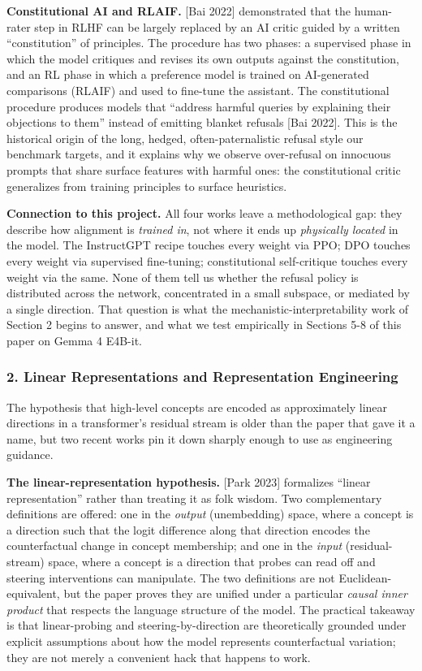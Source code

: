 \documentclass[
  11pt,
]{article}
\begin{document}
\textbf{Constitutional AI and RLAIF.} {[}Bai 2022{]} demonstrated that
the human-rater step in RLHF can be largely replaced by an AI critic
guided by a written ``constitution'' of principles. The procedure has
two phases: a supervised phase in which the model critiques and revises
its own outputs against the constitution, and an RL phase in which a
preference model is trained on AI-generated comparisons (RLAIF) and used
to fine-tune the assistant. The constitutional procedure produces models
that ``address harmful queries by explaining their objections to them''
instead of emitting blanket refusals {[}Bai 2022{]}. This is the
historical origin of the long, hedged, often-paternalistic refusal style
our benchmark targets, and it explains why we observe over-refusal on
innocuous prompts that share surface features with harmful ones: the
constitutional critic generalizes from training principles to surface
heuristics.

\textbf{Connection to this project.} All four works leave a
methodological gap: they describe how alignment is \emph{trained in},
not where it ends up \emph{physically located} in the model. The
InstructGPT recipe touches every weight via PPO; DPO touches every
weight via supervised fine-tuning; constitutional self-critique touches
every weight via the same. None of them tell us whether the refusal
policy is distributed across the network, concentrated in a small
subspace, or mediated by a single direction. That question is what the
mechanistic-interpretability work of Section 2 begins to answer, and
what we test empirically in Sections 5-8 of this paper on Gemma 4
E4B-it.

\subsubsection{2. Linear Representations and Representation
Engineering}\label{linear-representations-and-representation-engineering}

The hypothesis that high-level concepts are encoded as approximately
linear directions in a transformer's residual stream is older than the
paper that gave it a name, but two recent works pin it down sharply
enough to use as engineering guidance.

\textbf{The linear-representation hypothesis.} {[}Park 2023{]}
formalizes ``linear representation'' rather than treating it as folk
wisdom. Two complementary definitions are offered: one in the
\emph{output} (unembedding) space, where a concept is a direction such
that the logit difference along that direction encodes the
counterfactual change in concept membership; and one in the \emph{input}
(residual-stream) space, where a concept is a direction that probes can
read off and steering interventions can manipulate. The two definitions
are not Euclidean-equivalent, but the paper proves they are unified
under a particular \emph{causal inner product} that respects the
language structure of the model. The practical takeaway is that
linear-probing and steering-by-direction are theoretically grounded
under explicit assumptions about how the model represents counterfactual
variation; they are not merely a convenient hack that happens to work.
\end{document}
